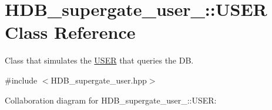 \hypertarget{classHDB__supergate__user___1_1USER}{}\section{H\+D\+B\+\_\+supergate\+\_\+user\+\_\+\+:\+:U\+S\+ER Class Reference}
\label{classHDB__supergate__user___1_1USER}


Class that simulates the \hyperlink{classHDB__supergate__user___1_1USER}{U\+S\+ER} that queries the DB.  




{\ttfamily \#include $<$H\+D\+B\+\_\+supergate\+\_\+user.\+hpp$>$}



Collaboration diagram for H\+D\+B\+\_\+supergate\+\_\+user\+\_\+\+:\+:U\+S\+ER\+:
